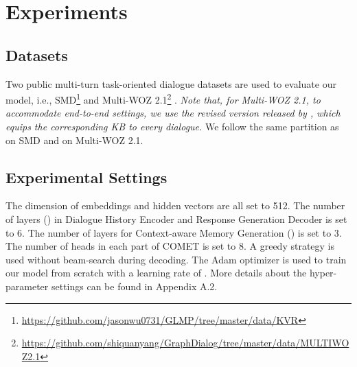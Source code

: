 \documentclass[11pt]{article}
\begin{document}
\section{Experiments}
\label{sec:experiments}


\subsection{Datasets}
\label{ssec:datasets}
Two public multi-turn task-oriented dialogue datasets are used to evaluate our model, i.e., SMD\footnote{\url{https://github.com/jasonwu0731/GLMP/tree/master/data/KVR}} \cite{eric-etal-2017-key} and Multi-WOZ 2.1\footnote{\url{https://github.com/shiquanyang/GraphDialog/tree/master/data/MULTIWOZ2.1}} \cite{budzianowski-etal-2018-multiwoz}. \textit{Note that, for Multi-WOZ 2.1, to accommodate end-to-end settings, we use the revised version released by \cite{yang-etal-2020-graphdialog}, which equips the corresponding KB to every dialogue.} We follow the same partition as \cite{madotto-etal-2018-mem2seq} on SMD and \cite{yang-etal-2020-graphdialog} on Multi-WOZ 2.1. 

\subsection{Experimental Settings}
The dimension of embeddings and hidden vectors are all set to 512. The number of layers () in Dialogue History Encoder and Response Generation Decoder is set to 6. The number of layers for Context-aware Memory Generation () is set to 3. The number of heads in each part of COMET is set to 8. A greedy strategy is used without beam-search during decoding. The Adam optimizer \cite{kingma2014adam} is used to train our model from scratch with a learning rate of . More details about the hyper-parameter settings can be found in Appendix A.2.
\end{document}
